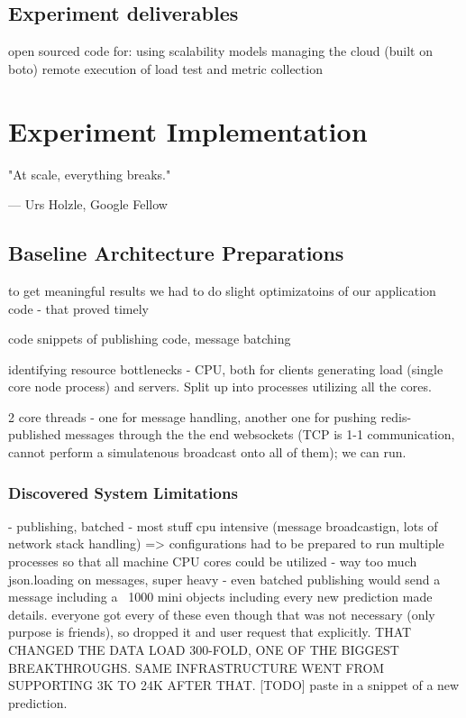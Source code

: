 \documentclass{uvamscse}
\begin{document}
\section{Experiment deliverables}\label{Experiment deliverables}
open sourced code for:
using scalability models
managing the cloud (built on boto)
remote execution of load test and metric collection


\chapter{Experiment Implementation} \label{Experiment Implementation}

\epigraph{"At scale, everything breaks."}{--- Urs Holzle, Google Fellow}

\section{Baseline Architecture Preparations}\label{Baseline Architecture Preparations}
to get meaningful results we had to do slight optimizatoins of our application code - that proved timely

code snippets of publishing code, message batching

identifying resource bottlenecks - CPU, both for clients generating load (single core node process) and servers. Split up into processes utilizing all the cores.

2 core threads - one for message handling, another one for pushing redis-published messages through the the end websockets (TCP is 1-1 communication, cannot perform a simulatenous broadcast onto all of them); we can run.


\subsection{Discovered System Limitations}\label{Discovered System Limitations}
- publishing, batched
- most stuff cpu intensive (message broadcastign, lots of network stack handling) => configurations had to be prepared to run multiple processes so that all machine CPU cores could be utilized
- way too much json.loading on messages, super heavy
- even batched publishing would send a message including a ~1000 mini objects including every new prediction made details. everyone got every of these even though that was not necessary (only purpose is friends), so dropped it and user request that explicitly. THAT CHANGED THE DATA LOAD 300-FOLD, ONE OF THE BIGGEST BREAKTHROUGHS. SAME INFRASTRUCTURE WENT FROM SUPPORTING 3K TO 24K AFTER THAT. [TODO] paste in a snippet of a new prediction.
\end{document}
